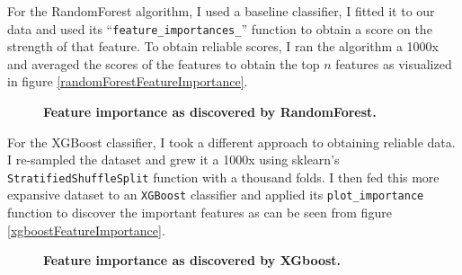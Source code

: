 \documentclass[titlepage,numbers=noenddot,headinclude,%
               footinclude=true,abstractoff,BCOR=5mm,%
               paper=a4,fontsize=11pt,ngerman,american]{scrreprt}
\numberwithin{theorem}{chapter}
\numberwithin{definition}{chapter}
\numberwithin{algorithm}{chapter}
\numberwithin{figure}{chapter}
\numberwithin{table}{chapter}
\numberwithin{equation}{chapter}
\begin{document}
For the RandomForest algorithm, I used a baseline classifier, I fitted it to our data and used its ``\texttt{feature\_importances\_}'' function to obtain a score on the strength of that feature. To obtain reliable scores, I ran the algorithm a 1000x and averaged the scores of the features to obtain the top $n$ features as visualized in figure \ref{randomForestFeatureImportance}.

\begin{figure}[!hbtp]
\centering

    \caption{\textbf{Feature importance as discovered by RandomForest.} \textit{}}
\end{figure}

For the XGBoost classifier, I took a different approach to obtaining reliable data. I re-sampled the dataset and grew it a 1000x using sklearn's \texttt{StratifiedShuffleSplit} function with a thousand folds. I then fed this more expansive dataset to an \texttt{XGBoost} classifier and applied its \texttt{plot\_importance} function to discover the important features as can be seen from figure \ref{xgboostFeatureImportance}.

\begin{figure}[!hbtp]
\centering

    \caption{\textbf{Feature importance as discovered by XGboost.} \textit{}}
\end{figure}
\end{document}
